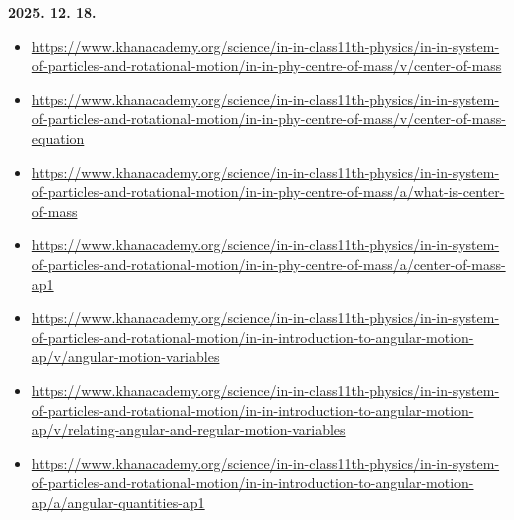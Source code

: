 \documentclass[12pt]{report}
\begin{document}
\noindent\textbf{2025. 12. 18.}
\begin{itemize}[left=0pt, topsep=0pt]
    \item \url{https://www.khanacademy.org/science/in-in-class11th-physics/in-in-system-of-particles-and-rotational-motion/in-in-phy-centre-of-mass/v/center-of-mass}
    \item \url{https://www.khanacademy.org/science/in-in-class11th-physics/in-in-system-of-particles-and-rotational-motion/in-in-phy-centre-of-mass/v/center-of-mass-equation}
    \item \url{https://www.khanacademy.org/science/in-in-class11th-physics/in-in-system-of-particles-and-rotational-motion/in-in-phy-centre-of-mass/a/what-is-center-of-mass}
    \item \url{https://www.khanacademy.org/science/in-in-class11th-physics/in-in-system-of-particles-and-rotational-motion/in-in-phy-centre-of-mass/a/center-of-mass-ap1}
    \item \url{https://www.khanacademy.org/science/in-in-class11th-physics/in-in-system-of-particles-and-rotational-motion/in-in-introduction-to-angular-motion-ap/v/angular-motion-variables}
    \item \url{https://www.khanacademy.org/science/in-in-class11th-physics/in-in-system-of-particles-and-rotational-motion/in-in-introduction-to-angular-motion-ap/v/relating-angular-and-regular-motion-variables}
    \item \url{https://www.khanacademy.org/science/in-in-class11th-physics/in-in-system-of-particles-and-rotational-motion/in-in-introduction-to-angular-motion-ap/a/angular-quantities-ap1}
\end{itemize}
\end{document}
